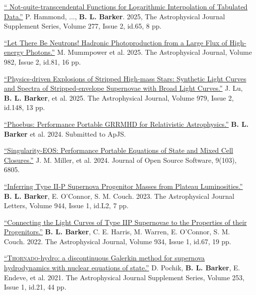 \documentclass[11pt]{vitae}
\begin{document}
\begin{publist}

\item \href{https://ui.adsabs.harvard.edu/abs/2025ApJS..277...65H/abstract}{`` Not-quite-transcendental Functions for Logarithmic Interpolation of Tabulated Data.''} P. Hammond, ..., \textbf{B. L. Barker}. 2025, The Astrophysical Journal Supplement Series, Volume 277, Issue 2, id.65, 8 pp.

\item \href{https://ui.adsabs.harvard.edu/abs/2025ApJ...982...81M/abstract}{``Let There Be Neutrons! Hadronic Photoproduction from a Large Flux of High-energy Photons.''} M. Mummpower et al. 2025. The Astrophysical Journal, Volume 982, Issue 2, id.81, 16 pp.

\item \href{https://ui.adsabs.harvard.edu/abs/2025ApJ...979..148L/abstract}{``Physics-driven Explosions of Stripped High-mass Stars: Synthetic Light Curves and Spectra of Stripped-envelope Supernovae with Broad Light Curves.''} J. Lu, \textbf{B. L. Barker}, et al. 2025. The Astrophysical Journal, Volume 979, Issue 2, id.148, 13 pp.

\item \href{https://ui.adsabs.harvard.edu/abs/2024arXiv241009146B/abstract}{``Phoebus: Performance Portable GRRMHD for Relativistic Astrophysics.''} \textbf{B. L. Barker} et al. 2024. Submitted to ApJS.

\item \href{https://joss.theoj.org/papers/10.21105/joss.06805}{``Singularity-EOS: Performance Portable Equations of State and Mixed Cell Closures.''} J. M. Miller, et al. 2024. Journal of Open Source Software, 9(103), 6805.

\item \href{https://doi.org/10.48550/arXiv.2211.05789}{``Inferring Type II-P Supernova Progenitor Masses from Plateau Luminosities.''} \textbf{B. L. Barker}, E. O'Connor, S. M. Couch. 2023. The Astrophysical Journal Letters, Volume 944, Issue 1, id.L2, 7 pp.

\item \href{https://doi.org/10.3847/1538-4357/ac77f3}{``Connecting the Light Curves of Type IIP Supernovae to the Properties of their Progenitors.''} \textbf{B. L. Barker}, C. E. Harris, M. Warren, E. O'Connor, S. M. Couch. 2022. The Astrophysical Journal, Volume 934, Issue 1, id.67, 19 pp.

\item \href{https://iopscience.iop.org/article/10.3847/1538-4365/abd700}{``\textsc{Thornado}-hydro: a discontinuous Galerkin method for supernova hydrodynamics with nuclear equations of state.''} D. Pochik, \textbf{B. L. Barker}, E. Endeve, et al. 2021. The Astrophysical Journal Supplement Series, Volume 253, Issue 1, id.21, 44 pp.


\end{publist}
\end{document}

